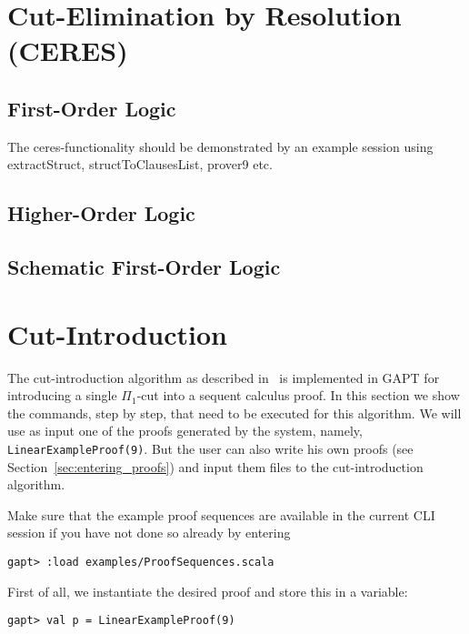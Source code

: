 \documentclass[a4paper,11pt]{article}
\begin{document}
\section{Cut-Elimination by Resolution (CERES)}


\subsection{First-Order Logic}

\begin{meta}
The ceres-functionality should be demonstrated by an example
session using extractStruct, structToClausesList, prover9 etc.
\end{meta}


\subsection{Higher-Order Logic}


\subsection{Schematic First-Order Logic}


\section{Cut-Introduction}

The cut-introduction algorithm as described in~\cite{Hetzl2012,Hetzl14Algorithmic,Hetzl14Introducing} is
implemented in GAPT for introducing a single $\Pi_1$-cut into a sequent calculus
proof. In this section we show the commands, step by step, that need to be
executed for this algorithm. We will use as input one of the proofs generated by
the system, namely, \texttt{LinearExampleProof(9)}. But the user can also
write his own proofs (see Section~\ref{sec:entering_proofs})
and input them files to the cut-introduction algorithm.

Make sure that the example proof sequences are available in the current CLI
session if you have not done so already by entering
\begin{lstlisting}
gapt> :load examples/ProofSequences.scala
\end{lstlisting}
%
First of all, we instantiate the desired proof and store this in a variable:
\begin{lstlisting}
gapt> val p = LinearExampleProof(9)
\end{lstlisting}
\end{document}
